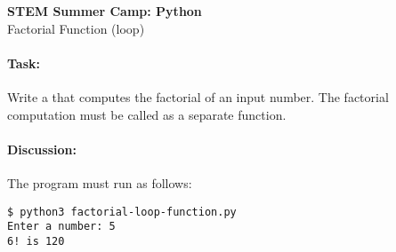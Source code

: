\documentclass[11pt]{article}
\begin{document}
    \begin{center}

        \large\textbf{STEM Summer Camp: Python} \\
        Factorial Function (loop) \\

    \end{center}

    \paragraph{Task:} Write a that computes the factorial of an input
    number. The factorial computation must be called as a separate
    function.  
    
    \paragraph{Discussion:} The program must run as follows:
    
    \vspace{1.5em}

\begin{verbatim}
$ python3 factorial-loop-function.py
Enter a number: 5
6! is 120
\end{verbatim}
    
\end{document}
